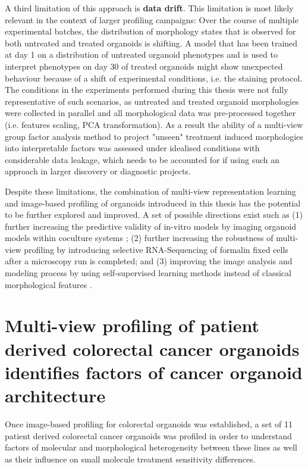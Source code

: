 \begin{flushleft}
A third limitation of this approach is \textbf{data drift}. This limitation is most likely relevant in the context of larger profiling campaigns: Over the course of multiple experimental batches, the distribution of morphology states that is observed for both untreated and treated organoids is shifting. A model that has been trained at day 1 on a distribution of untreated organoid phenotypes and is used to interpret phenotypes on day 30 of treated organoids might show unexpected behaviour because of a shift of experimental conditions, i.e. the staining protocol. The conditions in the experiments performed during this thesis were not fully representative of such scenarios, as untreated and treated organoid morphologies were collected in parallel and all morphological data was pre-processed together (i.e. features scaling, PCA transformation). As a result the ability of a multi-view group factor analysis method to project "unseen" treatment induced morphologies into interpretable factors was assessed under idealised conditions with considerable data leakage, which needs to be accounted for if using such an approach in larger discovery or diagnostic projects.
\par
\bigbreak

Despite these limitations, the combination of multi-view representation learning and image-based profiling of organoids introduced in this thesis has the potential to be further explored and improved. A set of possible directions exist such as (1) further increasing the predictive validity of in-vitro models by imaging organoid models within coculture systems \citep{cattaneoTumorOrganoidCell2020}; (2) further increasing the robustness of multi-view profiling by introducing selective RNA-Sequencing of formalin fixed cells after a microscopy run is completed; and (3) improving the image analysis and modeling process by using self-supervised learning methods instead of classical morphological features \citep{perakisContrastiveLearningSingleCell2021}.

\section{Multi-view profiling of patient derived colorectal cancer organoids identifies factors of cancer organoid architecture}

Once image-based profiling for colorectal organoids was established, a set of 11 patient derived colorectal cancer organoids was profiled in order to understand factors of molecular and morphological heterogeneity between these lines as well as their influence on small molecule treatment sensitivity differences.


\end{flushleft}
